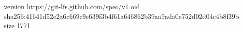 version https://git-lfs.github.com/spec/v1
oid sha256:41641d52e2a6c669e9e639f3b4f61a646862b39aa9ada0e752d02d04c4b8f39b
size 1771
